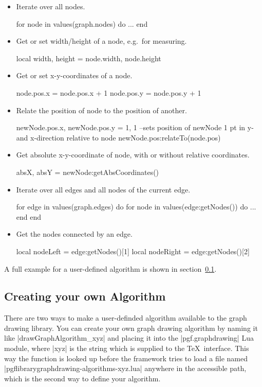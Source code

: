 \begin{itemize}
\item Iterate over all nodes.
\begin{codeexample}
for node in values(graph.nodes) do
   ...
end
\end{codeexample}
\item Get or set width/height of a node, e.g.\ for measuring.
\begin{codeexample}
local width, height = node.width, node.height
\end{codeexample}
\item Get or set x-y-coordinates of a node.
\begin{codeexample}
node.pos.x = node.pos.x + 1
node.pos.y = node.pos.y + 1
\end{codeexample}
\item Relate the position of node to the position of another.
\begin{codeexample}
newNode.pos.x, newNode.pos.y = 1, 1
--sets position of newNode 1 pt in y- and x-direction relative to node
newNode.pos:relateTo(node.pos)
\end{codeexample}
\item Get absolute x-y-coordinate of node, with or without relative coordinates.
\begin{codeexample}
absX, absY = newNode:getAbsCoordinates()
\end{codeexample}
\item Iterate over all edges and all nodes of the current edge.
\begin{codeexample}
for edge in values(graph.edges) do
   for node in values(edge:getNodes()) do
      ...
   end
end
\end{codeexample}
\item Get the nodes connected by an edge.
\begin{codeexample}
local nodeLeft = edge:getNodes()[1]
local nodeRight = edge:getNodes()[2]
\end{codeexample}
\end{itemize}

A full example for a user-defined algorithm is shown in section~\ref{section-library-graphdrawing-ownAlgorithm}.

\subsection{Creating your own Algorithm}
\label{section-library-graphdrawing-ownAlgorithm}
There are two ways to make a user-definded algorithm
available to the graph drawing library.
You can create your own graph drawing algorithm by naming it like
|drawGraphAlgorithm_xyz| and placing it into the |pgf.graphdrawing|
Lua module, where |xyz| is the string which is supplied to the
\TeX\ interface.  This way the function is looked up before the
framework tries to load a file named
|pgflibrarygraphdrawing-algorithms-xyz.lua| anywhere in the accessible
path, which is the second way to define your algorithm.

